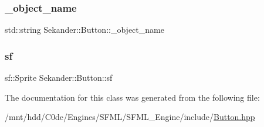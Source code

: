 \mbox{\label{classSekander_1_1Button_a886b33cb3c488812c52b7aba318b5f17}} 
\subsubsection{\texorpdfstring{\+\_\+object\+\_\+name}{\_object\_name}}
{\footnotesize\ttfamily std\+::string Sekander\+::\+Button\+::\+\_\+object\+\_\+name\hspace{0.3cm}{\ttfamily [private]}}

\mbox{\label{classSekander_1_1Button_a764d03180d09cc16d5b0075e64ed690e}} 
\subsubsection{\texorpdfstring{sf}{sf}}
{\footnotesize\ttfamily sf\+::\+Sprite Sekander\+::\+Button\+::sf\hspace{0.3cm}{\ttfamily [private]}}



The documentation for this class was generated from the following file\+:\begin{DoxyCompactItemize}
\item 
/mnt/hdd/\+C0de/\+Engines/\+S\+F\+M\+L/\+S\+F\+M\+L\+\_\+\+Engine/include/\hyperlink{Button_8hpp}{Button.\+hpp}\end{DoxyCompactItemize}
